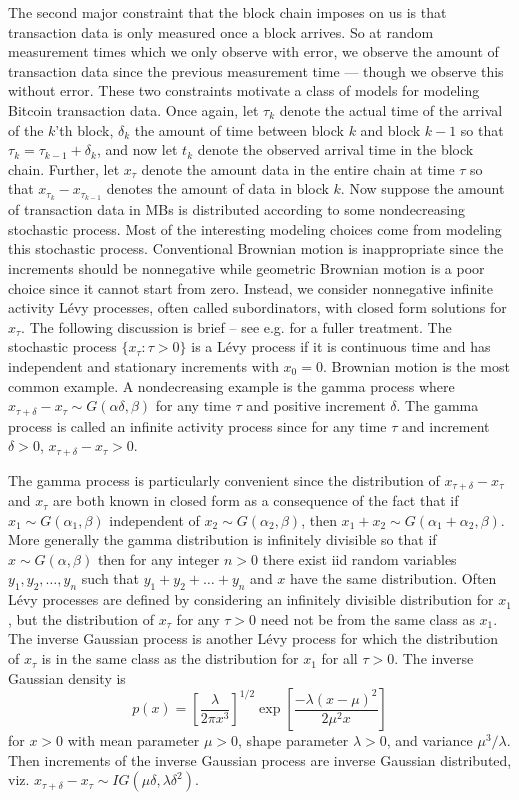 \documentclass{article}
\begin{document}
The second major constraint that the block chain imposes on us is that transaction data is only measured once a block arrives. So at random measurement times which we only observe with error, we observe the amount of transaction data since the previous measurement time --- though we observe this without error. These two constraints motivate a class of models for modeling Bitcoin transaction data. Once again, let $\tau_k$ denote the actual time of the arrival of the $k$'th block, $\delta_k$ the amount of time between block $k$ and block $k-1$ so that $\tau_{k}=\tau_{k-1} + \delta_k$, and now let $t_k$ denote the observed arrival time in the block chain. Further, let $x_\tau$ denote the amount data in the entire chain at time $\tau$ so that $x_{\tau_{k}} - x_{\tau_{k-1}}$ denotes the amount of data in block $k$. Now suppose the amount of transaction data in MBs is distributed according to some nondecreasing stochastic process. Most of the interesting modeling choices come from modeling this stochastic process. Conventional Brownian motion is inappropriate since the increments should be nonnegative while geometric Brownian motion is a poor choice since it cannot start from zero. Instead, we consider nonnegative infinite activity L\'{e}vy processes, often called subordinators, with closed form solutions for $x_{\tau}$. The following discussion is brief -- see e.g. \citet{barndorff2012basics} for a fuller treatment. The stochastic process $\{x_{\tau}:\tau>0\}$ is a L\'{e}vy process if it is continuous time and has independent and stationary increments with $x_0=0$. Brownian motion is the most common example. A nondecreasing example is the gamma process where $x_{\tau + \delta} - x_{\tau} \sim G(\alpha \delta, \beta)$ for any time $\tau$ and positive increment $\delta$. The gamma process is called an infinite activity process since for any time $\tau$ and increment $\delta>0$, $x_{\tau + \delta} - x_{\tau} > 0$.

The gamma process is particularly convenient since the distribution of $x_{\tau+\delta} - x_\tau$ and $x_\tau$ are both known in closed form as a consequence of the fact that if $x_1\sim G(\alpha_1,\beta)$ independent of $x_2\sim G(\alpha_2,\beta)$, then $x_1+x_2 \sim G(\alpha_1 + \alpha_2, \beta)$. More generally the gamma distribution is infinitely divisible so that if $x\sim G(\alpha,\beta)$ then for any integer $n>0$ there exist iid random variables $y_1,y_2,\dots,y_n$ such that $y_1+y_2+\dots+y_n$ and $x$ have the same distribution. Often L\'{e}vy processes are defined by considering an infinitely divisible distribution for $x_1$, but the distribution of $x_{\tau}$ for any $\tau>0$ need not be from the same class as $x_1$. The inverse Gaussian process is another L\'{e}vy process for which the distribution of $x_\tau$ is in the same class as the distribution for $x_1$ for all $\tau>0$. The inverse Gaussian density is
\[
p(x) = \left[\frac{\lambda}{2\pi x^3}\right]^{1/2}\exp\left[\frac{-\lambda(x - \mu)^2}{2\mu^2x}\right]
\]
for $x>0$ with mean parameter $\mu>0$, shape parameter $\lambda>0$, and variance $\mu^3/\lambda$. Then increments of the inverse Gaussian process are inverse Gaussian distributed, viz. $x_{\tau + \delta} - x_\tau \sim IG(\mu\delta,\lambda\delta^2)$.
\end{document}
